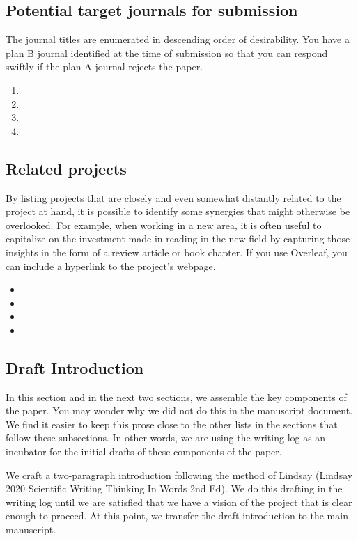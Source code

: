 \documentclass[10pt,letterpaper]{article}
\newcommand{\be}{\begin{enumerate}}
\newcommand{\ee}{\end{enumerate}}
\begin{document}
\subsection{Potential target journals for submission}
\label{sub:target-journals}

The journal titles are enumerated in descending order of desirability.
You have a plan B journal identified at the time of submission so that you can respond swiftly if the plan A journal rejects the paper.

\be
  \item 
  \item
  \item
  \item
\ee


\subsection{Related projects}
\label{sub:related-projects}

By listing projects that are closely and even somewhat distantly related to the project at hand, it is possible to identify some synergies that might otherwise be overlooked.
For example, when working in a new area, it is often useful to capitalize on the investment made in reading in the new field by capturing those insights in the form of a review article or book chapter.
If you use Overleaf, you can include a hyperlink to the project's webpage.

\begin{itemize}
  \item
  \item 
  \item 
  \item 
\end{itemize}

\subsection{Draft Introduction}
\label{subsec:Introduction}

In this section and in the next two sections, we assemble the key components of the paper.
You may wonder why we did not do this in the manuscript document.
We find it easier to keep this prose close to the other lists in the sections that follow these subsections.
In other words, we are using the writing log as an incubator for the initial drafts of these components of the paper.

We craft a two-paragraph introduction following the method of Lindsay (Lindsay 2020 Scientific Writing Thinking In Words 2nd Ed).
We do this drafting in the writing log until we are satisfied that we have a vision of the project that is clear enough to proceed.
At this point, we transfer the draft introduction to the main manuscript.
\end{document}
